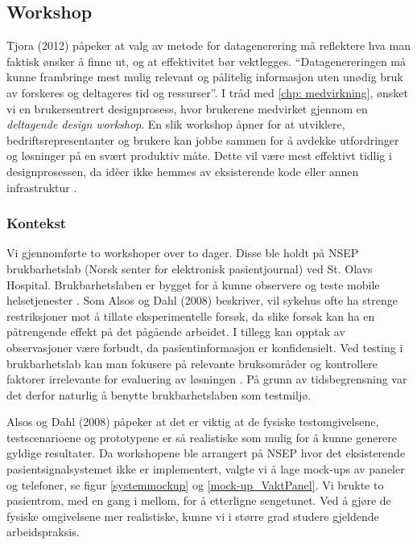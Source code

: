 \subsection{Workshop}
\label{subsec:workshops}

Tjora (2012) påpeker at valg av metode for datagenerering må reflektere hva man faktisk ønsker å finne ut, og at effektivitet bør vektlegges. “Datagenereringen må kunne frambringe mest mulig relevant og pålitelig informasjon uten unødig bruk av forskeres og deltageres tid og ressurser”.
I tråd med \ref{chp: medvirkning}, ønsket vi en brukersentrert designprosess, hvor brukerene medvirket gjennom en \emph{deltagende design workshop}.
En slik workshop åpner for at utviklere, bedriftsrepresentanter og brukere kan jobbe sammen for å avdekke utfordringer og løsninger på en svært produktiv måte. Dette vil være mest effektivt tidlig i designprosessen, da idèer ikke hemmes av eksisterende kode eller annen infrastruktur \cite{Gaffney99}.

\subsubsection{Kontekst}
Vi gjennomførte to workshoper over to dager. Disse ble holdt på NSEP brukbarhetslab (Norsk senter for elektronisk pasientjournal) ved St. Olavs Hospital. Brukbarhetslaben er bygget for å kunne observere og teste mobile helsetjenester \cite{NSEP}.
Som Alsos og Dahl (2008) beskriver, vil sykehus ofte ha strenge restriksjoner mot å tillate eksperimentelle forsøk, da slike forsøk kan ha en påtrengende effekt på det pågående arbeidet. I tillegg kan opptak av observasjoner være forbudt, da pasientinformasjon er konfidensielt. Ved testing i brukbarhetslab kan man fokusere på relevante bruksområder og kontrollere faktorer irrelevante for evaluering av løsningen \cite{Alsos08}. På grunn av tidsbegrensning var det derfor naturlig å benytte brukbarhetslaben som testmiljø.   

\noindent
Alsos og Dahl (2008) påpeker at det er viktig at de fysiske testomgivelsene, testscenarioene og prototypene er så realistiske som mulig for å kunne generere gyldige resultater. Da workshopene ble arrangert på NSEP hvor det eksisterende pasientsignalsystemet ikke er implementert, valgte vi å lage mock-ups av paneler og telefoner, se figur \ref{systemmockup} og \ref{mock-up_VaktPanel}. Vi brukte to pasientrom, med en gang i mellom, for å etterligne sengetunet. Ved å gjøre de fysiske omgivelsene mer realistiske, kunne vi i større grad studere gjeldende arbeidspraksis.


